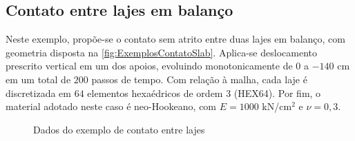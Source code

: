 \documentclass[Tese.tex]{subfiles}
\begin{document}
\subsection{Contato entre lajes em balanço}\label{subsec:ExemplosContatoSlab}

Neste exemplo, propõe-se o contato sem atrito entre duas lajes em balanço, com geometria disposta na \autoref{fig:ExemplosContatoSlab}. Aplica-se deslocamento prescrito vertical em um dos apoios, evoluindo monotonicamente de $0$ a $-140$ cm em um total de $200$ passos de tempo. Com relação à malha, cada laje é discretizada em $64$ elementos hexaédricos de ordem 3 (HEX64). Por fim, o material adotado neste caso é neo-Hookeano, com $E = 1000$ kN/cm$^2$ e $\nu = 0,3$.

\begin{figure}[!htb]
	\centering
	\caption{Dados do exemplo de contato entre lajes}
	\label{fig:ExemplosContatoSlab}
	{\small
		\noindent{}
	}	
\end{figure}
\end{document}
